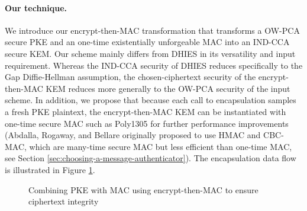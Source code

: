 \documentclass[runningheads]{llncs}
\newcommand{\mac}{\texttt{MAC}}
\newcommand{\pk}{\texttt{pk}}
\newcommand{\leftsample}{\stackrel{\$}{\leftarrow}}
\begin{document}
\paragraph{Our technique.} We introduce our encrypt-then-MAC transformation that transforms a OW-PCA secure PKE and an one-time existentially unforgeable MAC into an IND-CCA secure KEM. Our scheme mainly differs from DHIES in its versatility and input requirement. Whereas the IND-CCA security of DHIES reduces specifically to the Gap Diffie-Hellman assumption, the chosen-ciphertext security of the encrypt-then-MAC KEM reduces more generally to the OW-PCA security \cite{DBLP:conf/ctrsa/OkamotoP01} of the input scheme. In addition, we propose that because each call to encapsulation samples a fresh PKE plaintext, the encrypt-then-MAC KEM can be instantiated with one-time secure MAC such as Poly1305 for further performance improvements (Abdalla, Rogaway, and Bellare originally proposed to use HMAC and CBC-MAC, which are many-time secure MAC but less efficient than one-time MAC, see Section \ref{sec:choosing-a-message-authenticator}). The encapsulation data flow is illustrated in Figure \ref{fig:etm-diagram}.

\begin{figure}[H]
    \centering

    \caption{Combining PKE with MAC using encrypt-then-MAC to ensure ciphertext integrity}\label{fig:etm-diagram}
\end{figure}
\end{document}
